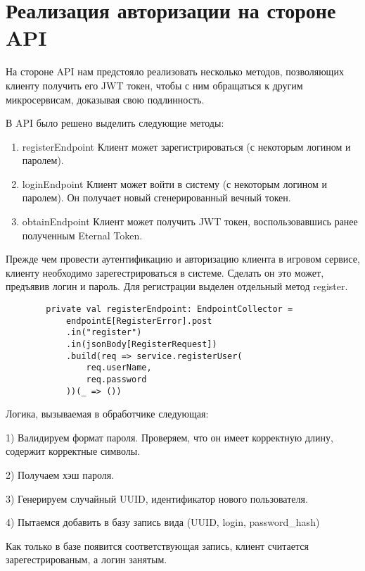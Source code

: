 \documentclass[14pt]{extarticle}
\begin{document}
    \section{Реализация авторизации на стороне API}

    На стороне API нам предстояло реализовать несколько методов, позволяющих клиенту получить его JWT токен,
    чтобы с ним обращаться к другим микросервисам, доказывая свою подлинность.

    В API было решено выделить следующие методы:
    \begin{enumerate}
        \item registerEndpoint
        Клиент может зарегистрироваться (с некоторым логином и паролем).
        \item loginEndpoint
        Клиент может войти в систему (с некоторым логином и паролем).
        Он получает новый сгенерированный вечный токен.
        \item obtainEndpoint
        Клиент может получить JWT токен, воспользовавшись ранее полученным Eternal Token.
    \end{enumerate}

    Прежде чем провести аутентификацию и авторизацию клиента
    в игровом сервисе, клиенту необходимо зарегестрироваться
    в системе. Сделать он это может, предъявив логин и пароль.
    Для регистрации выделен отдельный метод register.

    \begin{verbatim}
        private val registerEndpoint: EndpointCollector =
            endpointE[RegisterError].post
            .in("register")
            .in(jsonBody[RegisterRequest])
            .build(req => service.registerUser(
                req.userName,
                req.password
            ))(_ => ())
    \end{verbatim}

    Логика, вызываемая в обработчике следующая:

    1) Валидируем формат пароля. Проверяем, что он имеет корректную длину,
    содержит корректные символы.

    2) Получаем хэш пароля.

    3) Генерируем случайный UUID, идентификатор нового пользователя.

    4) Пытаемся добавить в базу запись вида (UUID, login, password\_hash)

    Как только в базе появится соответствующая запись, клиент считается зарегестрированым,
    а логин занятым.
\end{document}
